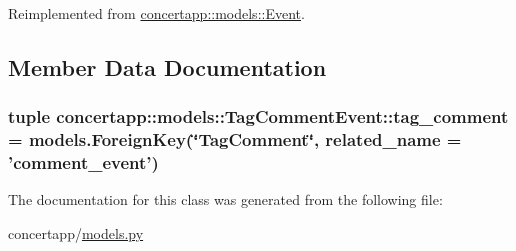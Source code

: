 Reimplemented from \hyperlink{classconcertapp_1_1models_1_1_event_a9a3f3dc074ee05120d953de9845080d0}{concertapp::models::Event}.



\subsection{Member Data Documentation}
\hypertarget{classconcertapp_1_1models_1_1_tag_comment_event_a8670ff9a4b50b54c043a603efc275a06}{
\subsubsection[{tag\_\-comment}]{\setlength{\rightskip}{0pt plus 5cm}tuple {\bf concertapp::models::TagCommentEvent::tag\_\-comment} = models.ForeignKey(\char`\"{}TagComment\char`\"{}, related\_\-name = 'comment\_\-event')}}
\label{classconcertapp_1_1models_1_1_tag_comment_event_a8670ff9a4b50b54c043a603efc275a06}


The documentation for this class was generated from the following file:\begin{DoxyCompactItemize}
\item 
concertapp/\hyperlink{models_8py}{models.py}\end{DoxyCompactItemize}
